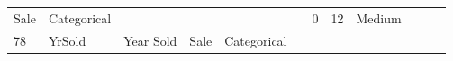\documentclass[11pt]{article}
\begin{document}
\begin{longtable}[]{@{}llllllllllll@{}}
\begin{minipage}[t]{0.04\columnwidth}
Sale\strut
\end{minipage} & \begin{minipage}[t]{0.04\columnwidth}\raggedright\strut
Categorical\strut
\end{minipage} & \begin{minipage}[t]{0.04\columnwidth}\raggedright\strut
\strut
\end{minipage} & \begin{minipage}[t]{0.04\columnwidth}\raggedright\strut
\strut
\end{minipage} & \begin{minipage}[t]{0.04\columnwidth}\raggedright\strut
\strut
\end{minipage} & \begin{minipage}[t]{0.04\columnwidth}\raggedright\strut
\strut
\end{minipage} & \begin{minipage}[t]{0.04\columnwidth}\raggedright\strut
0\strut
\end{minipage} & \begin{minipage}[t]{0.04\columnwidth}\raggedright\strut
12\strut
\end{minipage} & \begin{minipage}[t]{0.04\columnwidth}\raggedright\strut
Medium\strut
\end{minipage}\tabularnewline
\begin{minipage}[t]{0.04\columnwidth}\raggedright\strut
78\strut
\end{minipage} & \begin{minipage}[t]{0.04\columnwidth}\raggedright\strut
YrSold\strut
\end{minipage} & \begin{minipage}[t]{0.04\columnwidth}\raggedright\strut
Year Sold\strut
\end{minipage} & \begin{minipage}[t]{0.04\columnwidth}\raggedright\strut
Sale\strut
\end{minipage} & \begin{minipage}[t]{0.04\columnwidth}\raggedright\strut
Categorical\strut
\end{minipage} & \begin{minipage}[t]{0.04\columnwidth}\raggedright\strut
\strut
\end{minipage} & \begin{minipage}[t]{0.04\columnwidth}\raggedright\strut
\strut
\end{minipage} & \begin{minipage}[t]{0.04\columnwidth}\raggedright\strut

\end{minipage}
\end{longtable}
\end{document}
